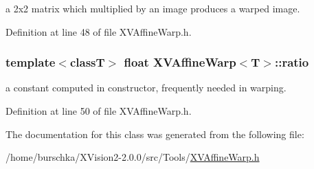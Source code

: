 a 2x2 matrix which multiplied by an image produces a warped image.



Definition at line 48 of file XVAffine\-Warp.h.\label{XVAffineWarp_o1}
\hypertarget{class_XVAffineWarp_o1}{
\subsubsection[ratio]{\setlength{\rightskip}{0pt plus 5cm}template$<$classT$>$ float XVAffine\-Warp$<$T$>$::ratio}}


a constant computed in constructor, frequently needed in warping.



Definition at line 50 of file XVAffine\-Warp.h.

The documentation for this class was generated from the following file:\begin{CompactItemize}
\item 
/home/burschka/XVision2-2.0.0/src/Tools/\hyperlink{XVAffineWarp.h-source}{XVAffine\-Warp.h}\end{CompactItemize}
